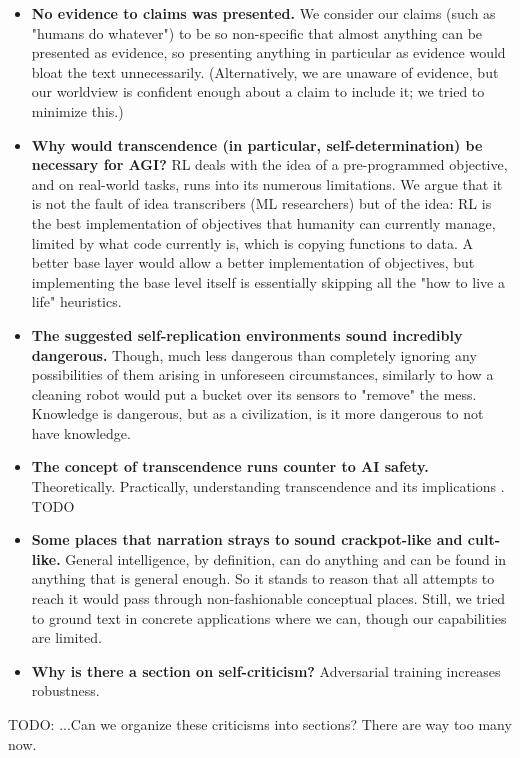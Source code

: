 \documentclass{article}
\begin{document}
\begin{itemize}
\item \textbf{No evidence to claims was presented.} We consider our claims (such as "humans do whatever") to be so non-specific that almost anything can be presented as evidence, so presenting anything in particular as evidence would bloat the text unnecessarily. (Alternatively, we are unaware of evidence, but our worldview is confident enough about a claim to include it; we tried to minimize this.)
\item \textbf{Why would transcendence (in particular, self-determination) be necessary for AGI?} RL deals with the idea of a pre-programmed objective, and on real-world tasks, runs into its numerous limitations. We argue that it is not the fault of idea transcribers (ML researchers) but of the idea: RL is the best implementation of objectives that humanity can currently manage, limited by what code currently is, which is copying functions to data. A better base layer would allow a better implementation of objectives, but implementing the base level itself is essentially skipping all the "how to live a life" heuristics.
\item \textbf{The suggested self-replication environments sound incredibly dangerous.} Though, much less dangerous than completely ignoring any possibilities of them arising in unforeseen circumstances, similarly to how a cleaning robot would put a bucket over its sensors to "remove" the mess. Knowledge is dangerous, but as a civilization, is it more dangerous to not have knowledge.
\item \textbf{The concept of transcendence runs counter to AI safety.} Theoretically. Practically, understanding transcendence and its implications . TODO
\item \textbf{Some places that narration strays to sound crackpot-like and cult-like.} General intelligence, by definition, can do anything and can be found in anything that is general enough. So it stands to reason that all attempts to reach it would pass through non-fashionable conceptual places. Still, we tried to ground text in concrete applications where we can, though our capabilities are limited.
\item \textbf{Why is there a section on self-criticism?} Adversarial training increases robustness.
\end{itemize}

    TODO: ...Can we organize these criticisms into sections? There are way too many now.

\printbibliography
\end{document}
